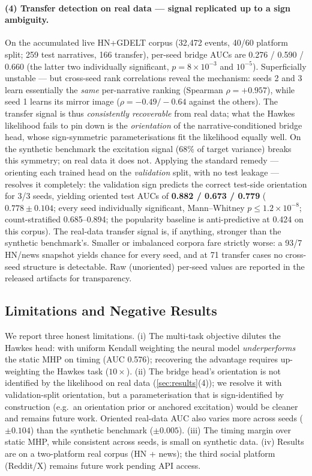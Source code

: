 \documentclass[11pt]{article}
\begin{document}
\paragraph{(4) Transfer detection on real data --- signal replicated up to a
sign ambiguity.} On the accumulated live HN+GDELT corpus (32{,}472 events,
40/60 platform split; 259 test narratives, 166 transfer), per-seed bridge AUCs
are 0.276 / 0.590 / 0.660 (the latter two individually significant,
$p = 8\times10^{-3}$ and $10^{-5}$). Superficially unstable --- but cross-seed
rank correlations reveal the mechanism: seeds 2 and 3 learn essentially the
\emph{same} per-narrative ranking (Spearman $\rho = +0.957$), while seed 1
learns its mirror image ($\rho = -0.49/-0.64$ against the others). The
transfer signal is thus \emph{consistently recoverable} from real data; what
the Hawkes likelihood fails to pin down is the \emph{orientation} of the
narrative-conditioned bridge head, whose sign-symmetric parameterisations fit
the likelihood equally well. On the synthetic benchmark the excitation signal
(68\% of target variance) breaks this symmetry; on real data it does not.
Applying the standard remedy --- orienting each trained head on the
\emph{validation} split, with no test leakage --- resolves it completely: the
validation sign predicts the correct test-side orientation for 3/3 seeds,
yielding oriented test AUCs of \textbf{0.882 / 0.673 / 0.779}
($0.778 \pm 0.104$; every seed individually significant, Mann--Whitney
$p \le 1.2\times10^{-8}$; count-stratified 0.685--0.894; the popularity
baseline is anti-predictive at 0.424 on this corpus). The real-data transfer
signal is, if anything, stronger than the synthetic benchmark's. Smaller or
imbalanced corpora fare strictly worse: a 93/7 HN/news snapshot yields chance
for every seed, and at 71 transfer cases no cross-seed structure is
detectable. Raw (unoriented) per-seed values are reported in the released
artifacts for transparency.

\subsection{Limitations and Negative Results}
\label{sec:limitations}

We report three honest limitations. (i) The multi-task objective dilutes the
Hawkes head: with uniform Kendall weighting the neural model \emph{underperforms}
the static MHP on timing (AUC 0.576); recovering the advantage requires
up-weighting the Hawkes task ($10\times$). (ii) The bridge head's orientation is not identified by the likelihood on real
data (\cref{sec:results}(4)); we resolve it with validation-split orientation,
but a parameterisation that is sign-identified by construction (e.g.\ an
orientation prior or anchored excitation) would be cleaner and remains future
work. Oriented real-data AUC also varies more across seeds ($\pm 0.104$) than
the synthetic benchmark ($\pm 0.005$). (iii) The timing margin over static
MHP, while consistent across seeds, is small on synthetic data. (iv) Results are
on a two-platform real corpus (HN + news); the third social platform (Reddit/X)
remains future work pending API access.
\end{document}

